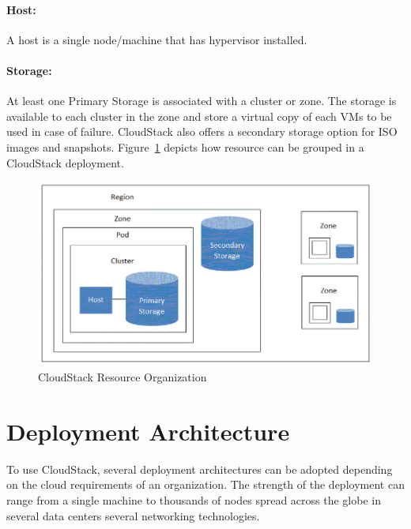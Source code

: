 \paragraph{Host:}	A host is a single node/machine that has hypervisor installed.
\paragraph{Storage:}	At least one Primary Storage is associated with a cluster or zone. The 
storage is available to each cluster in the zone and store a virtual copy of 
each VMs to be used in case of failure. CloudStack also offers a secondary storage
option for ISO images and snapshots.
Figure~\ref{F:cloudstack-resource-group} depicts how resource can 
be grouped in a CloudStack deployment.
\begin{figure}[htb]
\includegraphics[width=\textwidth]{../images/hid-sp18-417-cloudstack.png}
\caption{CloudStack Resource Organization~\cite{hid-sp18-417-cloudstack-resource-grouping}}
\label{F:cloudstack-resource-group}
\end{figure}

\section{Deployment Architecture}

To use CloudStack, several deployment architectures can be adopted
depending on the cloud requirements of an organization. The strength
of the deployment can range from a single machine to thousands of
nodes spread across the globe in several data centers several
networking technologies.

